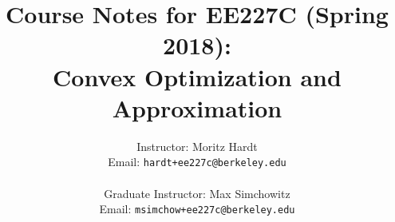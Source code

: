 \title{Course Notes for EE227C (Spring 2018):\\
 Convex Optimization and Approximation }
\author{Instructor: Moritz Hardt\\
{\small Email: \tt hardt+ee227c@berkeley.edu}\\ ~\\
Graduate Instructor: Max Simchowitz\\
{\small Email: \tt msimchow+ee227c@berkeley.edu}\\ ~\\
}

